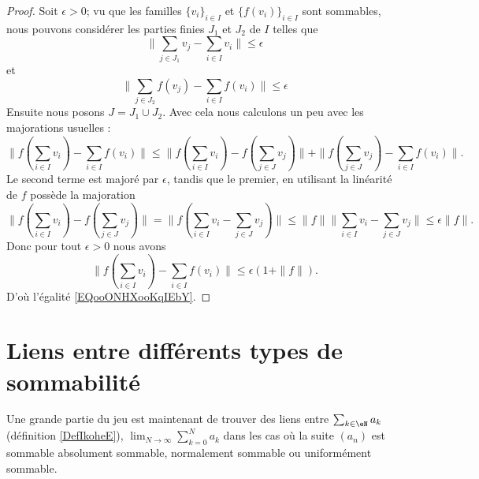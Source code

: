\begin{proof}
	Soit \( \epsilon>0\); vu que les familles \( \{ v_i \}_{i\in I}\) et \( \{ f(v_i) \}_{i\in I}\) sont sommables, nous pouvons considérer les parties finies \( J_1\) et \( J_2\) de \( I\) telles que
	\begin{equation}
		\big\| \sum_{j\in J_1}v_j-\sum_{i\in I}v_i \big\|\leq \epsilon
	\end{equation}
	et
	\begin{equation}
		\big\| \sum_{j\in J_2}f(v_j)-\sum_{i\in I}f(v_i) \big\|\leq \epsilon
	\end{equation}
	Ensuite nous posons \( J=J_1\cup J_2\). Avec cela nous calculons un peu avec les majorations usuelles :
	\begin{equation}
		\| f(\sum_{i\in I}v_i) -\sum_{i\in I}f(v_i) \|\leq \| f(\sum_{i\in I}v_i)- f(\sum_{j\in J}v_j) \|+  \| f(\sum_{j\in J}v_j)-\sum_{i\in I}f(v_i) \|.
	\end{equation}
	Le second terme est majoré par \( \epsilon\), tandis que le premier, en utilisant la linéarité de \( f\) possède la majoration
	\begin{equation}
		\| f(\sum_{i\in I}v_i)- f(\sum_{j\in J}v_j) \|=\| f(\sum_{i\in I}v_i-\sum_{j\in J}v_j) \|\leq \| f \| \| \sum_{i\in I}v_i- \sum_{j\in J}v_j\|\leq \epsilon\| f \|.
	\end{equation}
	Donc pour tout \( \epsilon>0\) nous avons
	\begin{equation}
		\| f(\sum_{i\in I}v_i) -\sum_{i\in I}f(v_i) \|\leq \epsilon(1+\| f \|).
	\end{equation}
	D'où l'égalité \eqref{EQooONHXooKqIEbY}.
\end{proof}


\section{Liens entre différents types de sommabilité}




Une grande partie du jeu est maintenant de trouver des liens entre \( \sum_{k\in \eN}a_k\) (définition \ref{DefIkoheE}), \( \lim_{N\to \infty}\sum_{k=0}^Na_k\) dans les cas où la suite \( (a_n)\) est sommable absolument sommable, normalement sommable ou uniformément sommable.

